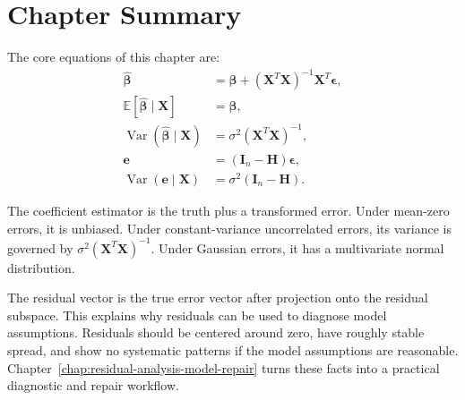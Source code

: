 \section{Chapter Summary}

The core equations of this chapter are:
\begin{align}
  \widehat{\boldsymbol{\beta}}
  &=\boldsymbol{\beta}
  +(\mathbf{X}^T\mathbf{X})^{-1}\mathbf{X}^T\boldsymbol{\epsilon}, \\
  \mathbb{E}[\widehat{\boldsymbol{\beta}}\mid\mathbf{X}]
  &=\boldsymbol{\beta}, \\
  \operatorname{Var}(\widehat{\boldsymbol{\beta}}\mid\mathbf{X})
  &=\sigma^2(\mathbf{X}^T\mathbf{X})^{-1}, \\
  \mathbf{e}
  &=(\mathbf{I}_n-\mathbf{H})\boldsymbol{\epsilon}, \\
  \operatorname{Var}(\mathbf{e}\mid\mathbf{X})
  &=\sigma^2(\mathbf{I}_n-\mathbf{H}).
\end{align}

The coefficient estimator is the truth plus a transformed error.  Under mean-zero errors, it is unbiased.  Under constant-variance uncorrelated errors, its variance is governed by \(\sigma^2(\mathbf{X}^T\mathbf{X})^{-1}\).  Under Gaussian errors, it has a multivariate normal distribution.

The residual vector is the true error vector after projection onto the residual subspace.  This explains why residuals can be used to diagnose model assumptions.  Residuals should be centered around zero, have roughly stable spread, and show no systematic patterns if the model assumptions are reasonable.  Chapter~\ref{chap:residual-analysis-model-repair} turns these facts into a practical diagnostic and repair workflow.

